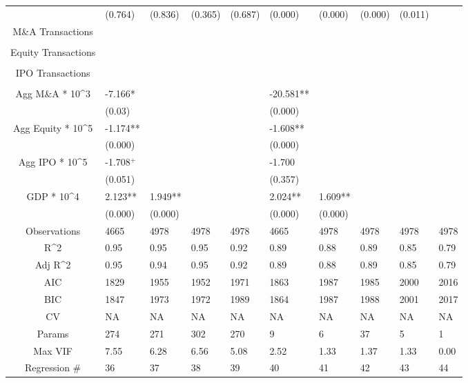 \documentclass{article}
\begin{document}
\begin{table}[H]
\begin{tabular}{|clllllllll|}
   & (0.764) & (0.836) & (0.365) & (0.687) & (0.000) & (0.000) & (0.000) & (0.011) &  \\ 
  M\&A Transactions &  &  &  &  &  &  &  &  &  \\ 
   &  &  &  &  &  &  &  &  &  \\ 
  Equity Transactions &  &  &  &  &  &  &  &  &  \\ 
   &  &  &  &  &  &  &  &  &  \\ 
  IPO Transactions &  &  &  &  &  &  &  &  &  \\ 
   &  &  &  &  &  &  &  &  &  \\ 
  Agg M\&A * 10^3 & -7.166* &  &  &  & -20.581** &  &  &  &  \\ 
   & (0.03) &  &  &  & (0.000) &  &  &  &  \\ 
  Agg Equity * 10^5 & -1.174** &  &  &  & -1.608** &  &  &  &  \\ 
   & (0.000) &  &  &  & (0.000) &  &  &  &  \\ 
  Agg IPO * 10^5 & -1.708$^{+}$ &  &  &  & -1.700 &  &  &  &  \\ 
   & (0.051) &  &  &  & (0.357) &  &  &  &  \\ 
  GDP * 10^4 & 2.123** & 1.949** &  &  & 2.024** & 1.609** &  &  &  \\ 
   & (0.000) & (0.000) &  &  & (0.000) & (0.000) &  &  &  \\ 
  \hline 
 Observations & 4665 & 4978 & 4978 & 4978 & 4665 & 4978 & 4978 & 4978 & 4978 \\ 
  R^2 & 0.95 & 0.95 & 0.95 & 0.92 & 0.89 & 0.88 & 0.89 & 0.85 & 0.79 \\ 
  Adj R^2 & 0.95 & 0.94 & 0.95 & 0.92 & 0.89 & 0.88 & 0.89 & 0.85 & 0.79 \\ 
  AIC & 1829 & 1955 & 1952 & 1971 & 1863 & 1987 & 1985 & 2000 & 2016 \\ 
  BIC & 1847 & 1973 & 1972 & 1989 & 1864 & 1987 & 1988 & 2001 & 2017 \\ 
  CV & NA & NA & NA & NA & NA & NA & NA & NA & NA \\ 
  Params & 274 & 271 & 302 & 270 & 9 & 6 & 37 & 5 & 1 \\ 
  Max VIF & 7.55 & 6.28 & 6.56 & 5.08 & 2.52 & 1.33 & 1.37 & 1.33 & 0.00 \\ 
  Regression \# & 36 & 37 & 38 & 39 & 40 & 41 & 42 & 43 & 44 \\ 
   \hline
\end{tabular}
 
\end{table}
\end{document}
